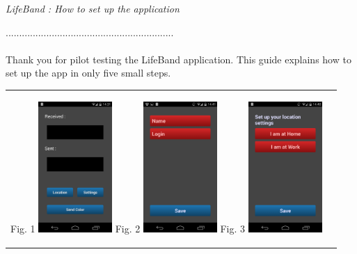\documentclass[11pt]{article}
\begin{document}
\begin{center}
\begin{large}
\textsl{LifeBand : How to set up the application} \\
\end{large}
.............................................................. \\
\end{center}

\paragraph{} Thank you for pilot testing the LifeBand application. This guide explains how to set up the app in only five small steps.

\begin{tabular}{p{3.5cm}p{12cm}}
\begin{center}
Fig. 1
\includegraphics[width=2.8cm]{home.png}\newline
Fig. 2
\includegraphics[width=2.8cm]{user.png}\newline
Fig. 3
\includegraphics[width=2.8cm]{location.png}\newline
\end{center}
&

\end{tabular}
\end{document}
